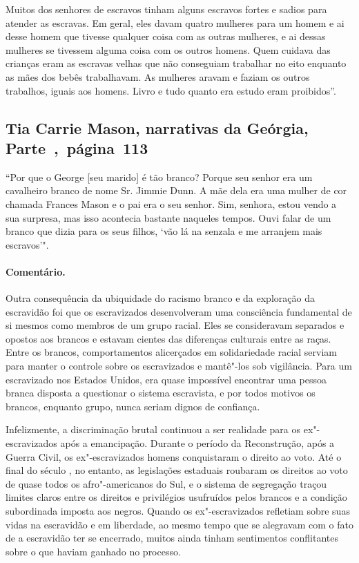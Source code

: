Muitos dos senhores de escravos tinham alguns escravos fortes e sadios
para atender as escravas. Em geral, eles davam quatro mulheres para um
homem e ai desse homem que tivesse qualquer coisa com as outras
mulheres, e ai dessas mulheres se tivessem alguma coisa com os outros
homens. Quem cuidava das crianças eram as escravas velhas que não
conseguiam trabalhar no eito enquanto as mães dos bebês trabalhavam. As
mulheres aravam e faziam os outros trabalhos, iguais aos homens. Livro e
tudo quanto era estudo eram proibidos''.

\subsection{Tia Carrie Mason, narrativas da Geórgia, Parte~,~página~113}
\label{ref183}

``Por que o George {[}seu marido{]} é tão branco? Porque seu senhor era
um cavalheiro branco de nome Sr. Jimmie Dunn. A mãe dela era uma mulher
de cor chamada Frances Mason e o pai era o seu senhor. Sim, senhora,
estou vendo a sua surpresa, mas isso acontecia bastante naqueles tempos.
Ouvi falar de um branco que dizia para os seus filhos, `vão lá na
senzala e me arranjem mais escravos'".

\paragraph{Comentário.}\quad
{\small
Outra consequência da ubiquidade do racismo branco e da exploração
da escravidão foi que os escravizados desenvolveram uma consciência
fundamental de si mesmos como membros de um grupo racial. Eles se
consideravam separados e opostos aos brancos e estavam cientes das
diferenças culturais entre as raças. Entre os brancos, comportamentos
alicerçados em solidariedade racial serviam para manter o controle sobre
os escravizados e mantê"-los sob vigilância. Para um escravizado nos Estados
Unidos, era quase impossível encontrar uma pessoa branca disposta a
questionar o sistema escravista, e por todos motivos os brancos,
enquanto grupo, nunca seriam dignos de confiança.

Infelizmente, a discriminação brutal continuou a ser realidade
para os ex"-escravizados após a emancipação. Durante o período da
Reconstrução, após a Guerra Civil, os ex"-escravizados homens conquistaram o
direito ao voto. Até o final do século , no entanto, as legislações
estaduais roubaram os direitos ao voto de quase todos os afro"-americanos
do Sul, e o sistema de segregação traçou limites claros entre os
direitos e privilégios usufruídos pelos brancos e a condição subordinada
imposta aos negros. Quando os ex"-escravizados refletiam sobre suas vidas na
escravidão e em liberdade, ao mesmo tempo que se alegravam com o fato de
a escravidão ter se encerrado, muitos ainda tinham sentimentos
conflitantes sobre o que haviam ganhado no processo.
}

